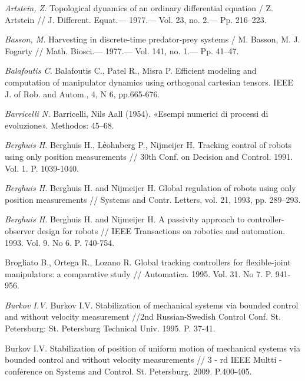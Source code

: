 \begin{thebibliography}{10}
	{\it Artstein, Z.} Topological dynamics of an ordinary differential equation / Z. Artstein // J.
	Different. Equat.— 1977.— Vol. 23, no. 2.— Pp. 216–223.
	
	{\it Basson, M.} Harvesting in discrete-time predator-prey systems / M. Basson, M. J. Fogarty // Math. Biosci.— 1977.— Vol. 141, no. 1.— Pp. 41–47.
	
	{\it Balafoutis C.} Balafoutis C., Patel R., Misra P. Efficient modeling and computation of manipulator dynamics using orthogonal cartesian tensors. IEEE J. of Rob. and Autom., 4, N 6, pp.665-676.
	
	{\it Barricelli N.} Barricelli, Nils Aall (1954). «Esempi numerici di processi di evoluzione». Methodos: 45–68.
	
	{\it Berghuis H.} Berghuis H., Lѐohnberg P., Nijmeijer H. Tracking control of robots using only position measurements // 30th Conf. on Decision and Control. 1991. Vol. 1. P. 1039-1040.
	
	{\it Berghuis H.} Berghuis H. and Nijmeijer H. Global regulation of robots using only position measurements // Systems and Contr. Letters, vol. 21, 1993, pp. 289–293. 
	
	{\it Berghuis H.} Berghuis H. and Nijmeijer H. A passivity approach to controller-observer design for robots // IEEE Transactions on robotics and automation. 1993. Vol. 9. No 6. P. 740-754.
	
	Brogliato B., Ortega R., Lozano R. Global tracking controllers for flexible-joint manipulators: a comparative study // Automatica. 1995. Vol. 31. No 7. P. 941-956.
	
	
	{\it Burkov I.V.} Burkov I.V. Stabilization of mechanical systems via bounded control and without velocity measurement //2nd Russian-Swedish Control Conf. St. Petersburg: St. Petersburg Technical Univ. 1995. P. 37-41.
	
	Burkov I.V. Stabilization of position of uniform motion of mechanical systems via bounded
	control and without velocity measurements // 3 - rd IEEE Multti - conference on Systems and Control.
	St. Petersburg. 2009. P.400-405.
	

\end{thebibliography}

